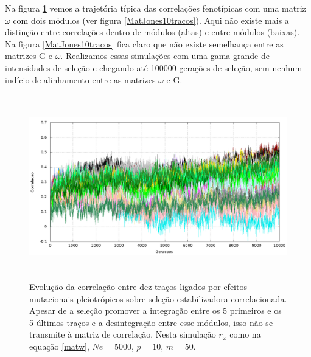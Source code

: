 \documentclass[a4paper, 12pt, titlepage, onecolumn]{article}
\numberwithin{equation}{section}
\numberwithin{table}{section}
\begin{document}
Na figura \ref{jones10tracos} vemos a trajetória típica das correlações
fenotípicas com uma matriz $\omega$ com dois módulos (ver figura
\ref{MatJones10tracos}).  Aqui não existe mais a distinção entre
correlações dentro de módulos (altas) e entre módulos (baixas). Na figura
\ref{MatJones10tracos} fica claro que não existe semelhança entre as
matrizes G e $\omega$. Realizamos essas simulações com uma gama grande
de intensidades de seleção e chegando até 100000 gerações de seleção,
sem nenhum indício de alinhamento entre as matrizes $\omega$ e G.  

\begin{center}
\begin{figure}[H]
  \includegraphics[width=150mm, height=80mm]{figuras/jones10tracos.png}
  \caption{Evolução da correlação entre dez traços ligados por efeitos
  mutacionais pleiotrópicos sobre seleção estabilizadora correlacionada.
  Apesar de a seleção promover a integração entre os 5 primeiros e os 5
  últimos traços e a desintegração entre esse módulos, isso não se
  transmite à matriz de correlação. Nesta simulação
    $r_\omega$ como na equação \ref{matw}, $Ne=5000$, $p=10$, $m=50$.}
  \label{jones10tracos}
\end{figure}
\end{center}
\end{document}
